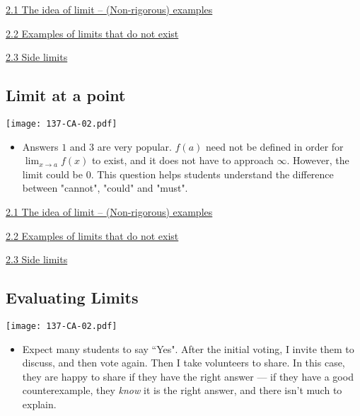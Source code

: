 \documentclass[11pt]{article}
\newcommand{\n}{\newpage}
\newcommand{\nl}{\hfill \vspace{-1.1\baselineskip}} %
\newcommand{\vi}{\hspace{8mm} \href{https://www.youtube.com/watch?v=UDGVvSXHLTQ&list=PLlwePzQY_wW8P_I8BFgm0-upywEwTKd8_&index=1}{2.1 The idea of limit -- (Non-rigorous) examples}}
\newcommand{\vii}{\hspace{8mm} \href{https://www.youtube.com/watch?v=bo2YmvSaTNI&list=PLlwePzQY_wW8P_I8BFgm0-upywEwTKd8_&index=3&t=0s}{2.2 Examples of limits that do not exist}}
\newcommand{\viii}{\hspace{8mm} \href{https://www.youtube.com/watch?v=299WBtK_qro&list=PLlwePzQY_wW8P_I8BFgm0-upywEwTKd8_&index=3}{2.3 Side limits}}
\begin{document}
\begin{videos}
\vi

\vii

 \viii
\end{videos}

\n
\subsection{Limit at a point} 

\begin{center}
{ \texttt{[image: 137-CA-02.pdf]}}
\end{center}

\begin{comments}
\nl
	\begin{itemize}
	\item Answers $1$ and $3$ are very popular. $f(a)$ need not be defined in order for $\displaystyle{\lim_{x\rightarrow a}f(x)}$ to exist, and it does not have to approach $\infty$. However, the limit could be 0. This question helps students understand the difference between "cannot", "could" and "must". 
	\end{itemize}
\end{comments}

\begin{videos}
\vi 

\vii 

\viii
\end{videos}

\n
\subsection{Evaluating Limits} 

\begin{center}
{ \texttt{[image: 137-CA-02.pdf]}}
\end{center}

\begin{comments}
\nl
	\begin{itemize}
	\item Expect many students to say ``Yes". After the initial voting, I invite them to discuss, and then vote again.  Then I take volunteers to share. In this case, they are happy to share if they have the right answer --- if they have a good counterexample, they \emph{know} it is the right answer, and there isn't much to explain.	
	\end{itemize}
\end{comments}
\end{document}
